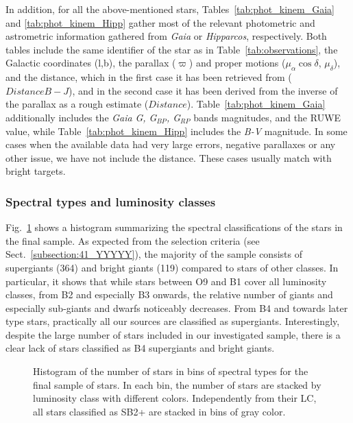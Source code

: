 \documentclass{aa}
\begin{document}
In addition, for all the above-mentioned stars, Tables~\ref{tab:phot_kinem_Gaia} and \ref{tab:phot_kinem_Hipp} gather most of the relevant photometric and astrometric information gathered from {\it Gaia} or \textit{Hipparcos}, respectively. Both tables include the same identifier of the star as in Table~\ref{tab:observations}, the Galactic coordinates (l,b), the parallax ($\varpi$) and proper motions ($\mu_{\alpha}\cos{\delta}$, $\mu_{\delta}$), and the distance, which in the first case it has been retrieved from \citet{2021AJ....161..147B} ($Distance {B-J}$), and in the second case it has been derived from the inverse of the parallax as a rough estimate ($Distance$). Table~\ref{tab:phot_kinem_Gaia} additionally includes the {\it Gaia} \textit{G, G$_{BP}$, G$_{RP}$} bands magnitudes, and the RUWE value, while Table~\ref{tab:phot_kinem_Hipp} includes the \textit{B-V} magnitude. In some cases when the available data had very large errors, negative parallaxes or any other issue, we have not include the distance. These cases usually match with bright targets.


\subsubsection{Spectral types and luminosity classes}
\label{subsubsection:421_EEEEE}

Fig.~\ref{fig:hist_spt} shows a histogram summarizing the spectral classifications of the stars in the final sample. As expected from the selection criteria (see Sect.~\ref{subsection:41_YYYYY}), the majority of the sample consists of supergiants (364) and bright giants (119) compared to stars of other classes. In particular, it shows that while stars between O9 and B1 cover all luminosity classes, from B2 and especially B3 onwards, the relative number of giants and especially sub-giants and dwarfs noticeably decreases. From B4 and towards later type stars, practically all our sources are classified as supergiants. Interestingly, despite the large number of stars included in our investigated sample, there is a clear lack of stars classified as B4 supergiants and bright giants. %
    
\begin{figure}[!t]
\centering
{}
\caption{Histogram of the number of stars in bins of spectral types for the final sample of stars. In each bin, the number of stars are stacked by luminosity class with different colors. Independently from their LC, all stars classified as SB2+ are stacked in bins of gray color.} 
\label{fig:hist_spt}
\end{figure}
    
\end{document}
